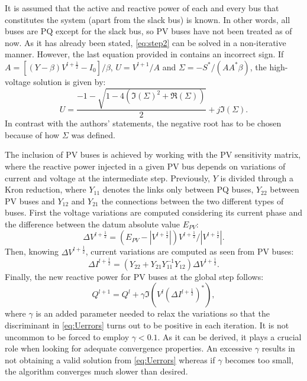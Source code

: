 \documentclass[journal]{IEEEtran}
\begin{document}
It is assumed that the active and reactive power of each and every bus that constitutes the system (apart from the slack bus) is known. In other words, all buses are PQ except for the slack bus, so PV buses have not been treated as of now. As it has already been stated, \eqref{eq:step2} can be solved in a non-iterative manner. However, the last equation provided in \cite{asd} contains an incorrect sign. If $A=[(Y-\beta)V^{l+\frac{1}{2}}-I_0]/\beta$, $U=V^{l+1}/A$ and $\Sigma=-S^*/(AA^*\beta)$, the high-voltage solution is given by:
\begin{equation}
  U=\frac{-1-\sqrt{1-4(\Im(\Sigma)^2+\Re(\Sigma))}}{2}+j\Im({\Sigma}).
  \label{eq:Uerrors}
\end{equation}
In contrast with the authors' statements, the negative root has to be chosen because of how $\Sigma$ was defined. 

The inclusion of PV buses is achieved by working with the PV sensitivity matrix, where the reactive power injected in a given PV bus depends on variations of current and voltage at the intermediate step. Previously, $Y$ is divided through a Kron reduction, where $Y_{11}$ denotes the links only between PQ buses, $Y_{22}$ between PV buses and $Y_{12}$ and $Y_{21}$ the connections between the two different types of buses. First the voltage variations are computed considering its current phase and the difference between the datum absolute value $E_{PV}$:
\begin{equation}
  \Delta V^{l+\frac{1}{2}} = (E_{PV}-|V^{l+\frac{1}{2}}|)V^{l+\frac{1}{2}}/|V^{l+\frac{1}{2}}|.
  \label{eq:incrV}
\end{equation}
Then, knowing $\Delta V^{l+\frac{1}{2}}$, current variations are computed as seen from PV buses:
\begin{equation}
  \Delta I^{l+\frac{1}{2}}=(Y_{22}+Y_{21}Y^{-1}_{11}Y_{12})\Delta V^{l + \frac{1}{2}}.
  \label{eq:incrI}
\end{equation}
Finally, the new reactive power for PV buses at the global step follows:
\begin{equation}
  Q^{l+1}=Q^l+\gamma \Im(V^l(\Delta I^{l+\frac{1}{2}})^*),
  \label{eq:Qdef}
\end{equation}
where $\gamma$ is an added parameter needed to relax the variations so that the discriminant in \eqref{eq:Uerrors} turns out to be positive in each iteration. It is not uncommon to be forced to employ $\gamma<0.1$. As it can be derived, it plays a crucial role when looking for adequate convergence properties. An excessive $\gamma$ results in not obtaining a valid solution from \eqref{eq:Uerrors} whereas if $\gamma$ becomes too small, the algorithm converges much slower than desired.
\end{document}

